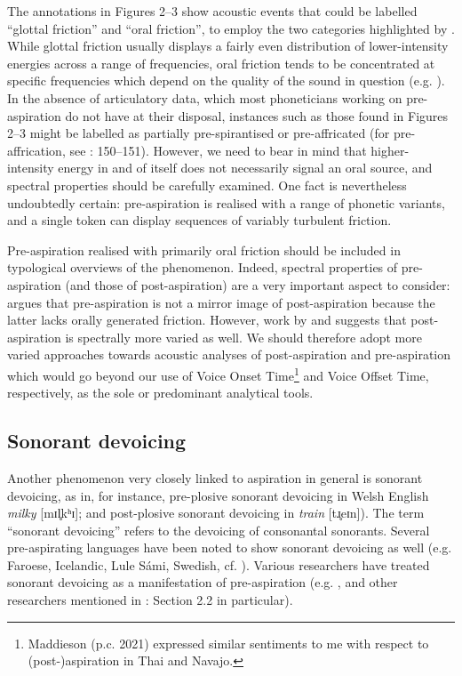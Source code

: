 \documentclass[output=paper]{langscibook}
\begin{document}
The annotations in Figures 2--3 show acoustic events that could be labelled “glottal friction” and “oral friction”, to employ the two categories highlighted by \citet{Silverman2003}. While glottal friction usually displays a fairly even distribution of lower-intensity energies across a range of frequencies, oral friction tends to be concentrated at specific frequencies which depend on the quality of the sound in question (e.g. \citealt{Fry1982}). In the absence of articulatory data, which most phoneticians working on pre\hyp aspiration do not have at their disposal, instances such as those found in Figures 2--3 might be labelled as partially pre-spirantised or pre-affricated (for pre-affrication, see \citealt{Laver1994}: 150--151). However, we need to bear in mind that higher-intensity energy in and of itself does not necessarily signal an oral source, and spectral properties should be carefully examined. One fact is nevertheless undoubtedly certain: pre\hyp aspiration is realised with a range of phonetic variants, and a single token can display sequences of variably turbulent friction.

Pre-aspiration realised with primarily oral friction should be included in typological overviews of the phenomenon. Indeed, spectral properties of pre\hyp aspiration (and those of post-aspiration) are a very important aspect to consider: \citet{Silverman2003} argues that pre\hyp aspiration is not a mirror image of post-aspiration because the latter lacks orally generated friction. However, work by \citet{Hejná2015, Hejná2016b} and \citet{NanceStuart-Smith2013} suggests that post-aspiration is spectrally more varied as well. We should therefore adopt more varied approaches towards acoustic analyses of post-aspiration and pre\hyp aspiration which would go beyond our use of Voice Onset Time\footnote{Maddieson (p.c. 2021) expressed similar sentiments to me with respect to (post-)aspiration in Thai and Navajo.} and Voice Offset Time, respectively, as the sole or predominant analytical tools.

\subsection{Sonorant devoicing}\label{sec:hejna:2.2}

Another phenomenon very closely linked to aspiration in general is sonorant devoicing, as in, for instance, pre-plosive sonorant devoicing in Welsh English \textit{milky} [mɪl̥kʰɪ]; and post-plosive sonorant devoicing in \textit{train} [tɹ̥eɪn]). The term “sonorant devoicing” refers to the devoicing of consonantal sonorants. Several pre-aspirating languages have been noted to show sonorant devoicing as well (e.g. Faroese, Icelandic, Lule Sámi, Swedish, cf. \cites[70]{LadefogedMaddieson1996}[11]{Helgason2002}). Various researchers have treated sonorant devoicing as a manifestation of pre\hyp aspiration (e.g. \citealt[70]{LadefogedMaddieson1996}, and other researchers mentioned in \citealt{Helgason2002}: Section 2.2 in particular).
\end{document}
